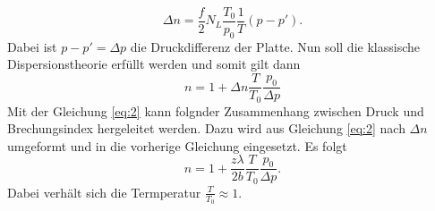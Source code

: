 \begin{equation*}
  \Delta n = \frac{f}{2} N_L \frac{T_0}{p_0}\frac{1}{T} (p-p').
\end{equation*}
Dabei ist $p-p'=\Delta p$ die Druckdifferenz der Platte.
Nun soll die klassische Dispersionstheorie erfüllt werden und somit gilt dann
\begin{equation*}
  n = 1 + \Delta n \frac{T}{T_0} \frac{p_0}{\Delta p}
\end{equation*}
Mit der Gleichung \ref{eq:2} kann folgnder Zusammenhang zwischen Druck und Brechungsindex
hergeleitet werden. Dazu wird aus Gleichung \ref{eq:2} nach $\Delta n$ umgeformt und
in die vorherige Gleichung eingesetzt. Es folgt
\begin{equation}
  n = 1 + \frac{z \lambda}{2b} \frac{T}{T_0} \frac{p_0}{\Delta p}.
  \label{eq:3}
\end{equation}
Dabei verhält sich die Termperatur $\frac{T}{T_0} \approx 1$. 
